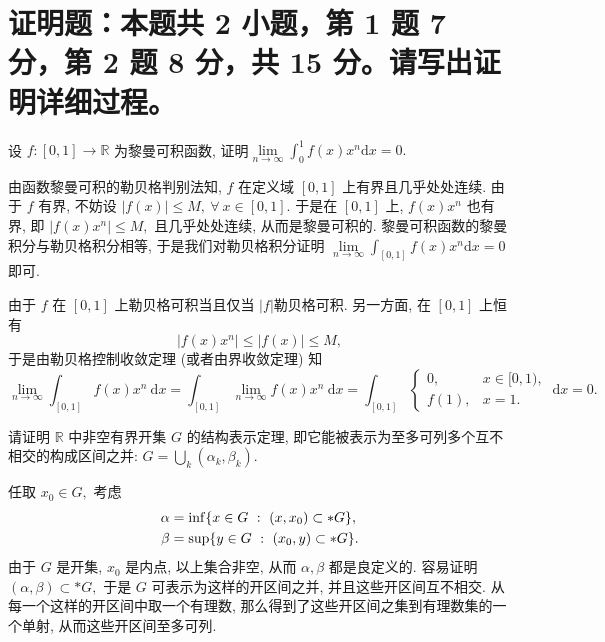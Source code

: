 \fi




\section{%
  证明题：本题共 2 小题，第 1 题 7 分，第 2 题 8 分，共 15 分。请写出证明详细过程。
}


\begin{question}[points = 7]
设 $f: [0, 1] \to \mathbb{R}$ 为黎曼可积函数, 证明$\lim\limits_{n\to\infty} \int_0^1 f(x) x^n \mathrm{d} x = 0.$
\end{question}

\begin{solution}
由函数黎曼可积的勒贝格判别法知, $f$ 在定义域 $[0, 1]$ 上有界且几乎处处连续. 由于 $f$ 有界, 不妨设 $\lvert f(x) \rvert \leqslant M, ~ \forall ~ x \in [0, 1].$
于是在 $[0, 1]$ 上, $f(x) x^n$ 也有界, 即 $|f(x) x^n| \leqslant M,$ 且几乎处处连续, 从而是黎曼可积的. 黎曼可积函数的黎曼积分与勒贝格积分相等,
于是我们对勒贝格积分证明 $\lim\limits_{n\to\infty} \int_{[0, 1]} f(x) x^n \mathrm{d} x = 0$ 即可. 

由于 $f$ 在 $[0, 1]$ 上勒贝格可积当且仅当 $\lvert f \rvert$勒贝格可积. 
另一方面, 在 $[0, 1]$ 上恒有
$$\lvert f(x) x^n \rvert \leqslant \lvert f(x) \rvert \leqslant M,$$
于是由勒贝格控制收敛定理 (或者由界收敛定理) 知 
$$\lim\limits_{n\to\infty} \int_{[0, 1]} f(x) x^n ~ \mathrm{d} x = \int_{[0, 1]} \lim\limits_{n\to\infty} f(x) x^n ~ \mathrm{d} x = \int_{[0, 1]} \begin{cases}
0, & x \in [0, 1), \\
f(1), & x = 1.
\end{cases} ~ \mathrm{d} x = 0.$$
\end{solution}

\begin{question}[points = 8]
请证明 $\mathbb{R}$ 中非空有界开集 $G$ 的结构表示定理, 即它能被表示为至多可列多个互不相交的构成区间之并: $G = \bigcup\limits_{k} (\alpha_k, \beta_k).$
\end{question}

\begin{solution}
任取 $x_0 \in G,$ 考虑
\begin{equation*}
\begin{aligned}
\alpha & = \inf \{ x \in G ~ : ~ (x, x_0) \subset* G \}, \\
\beta & = \sup \{ y \in G ~ : ~ (x_0, y) \subset* G \}.
\end{aligned} \score{2}
\end{equation*}
由于 $G$ 是开集, $x_0$ 是内点, 以上集合非空, 从而 $\alpha, \beta$ 都是良定义的. 
容易证明 $(\alpha, \beta) \subset* G,$ 于是 $G$ 可表示为这样的开区间之并, 并且这些开区间互不相交. 
从每一个这样的开区间中取一个有理数, 那么得到了这些开区间之集到有理数集的一个单射, 从而这些开区间至多可列. 
\end{solution}


